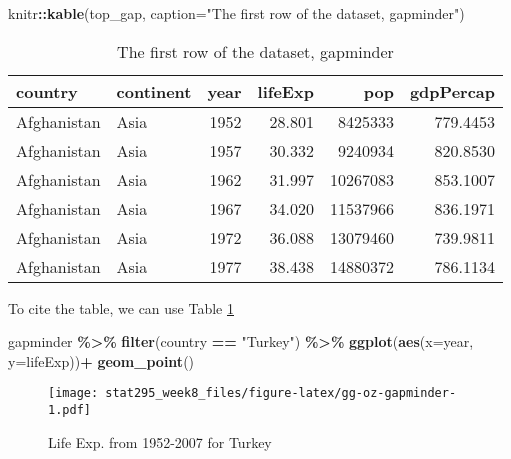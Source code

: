 \documentclass[
]{article}
\newenvironment{Shaded}{\begin{snugshade}}{\end{snugshade}}
\newcommand{\AttributeTok}[1]{\textcolor[rgb]{0.13,0.29,0.53}{#1}}
\newcommand{\FunctionTok}[1]{\textcolor[rgb]{0.13,0.29,0.53}{\textbf{#1}}}
\newcommand{\NormalTok}[1]{#1}
\newcommand{\SpecialCharTok}[1]{\textcolor[rgb]{0.81,0.36,0.00}{\textbf{#1}}}
\newcommand{\StringTok}[1]{\textcolor[rgb]{0.31,0.60,0.02}{#1}}
\begin{document}
\begin{Shaded}
\begin{Highlighting}[]
\NormalTok{knitr}\SpecialCharTok{::}\FunctionTok{kable}\NormalTok{(top\_gap,}
             \AttributeTok{caption=}\StringTok{"The first row of the dataset, gapminder"}\NormalTok{)}
\end{Highlighting}
\end{Shaded}

\begin{table}

\caption{\label{tab:mytable1}The first row of the dataset, gapminder}
\centering
\begin{tabular}[t]{l|l|r|r|r|r}
\hline
country & continent & year & lifeExp & pop & gdpPercap\\
\hline
Afghanistan & Asia & 1952 & 28.801 & 8425333 & 779.4453\\
\hline
Afghanistan & Asia & 1957 & 30.332 & 9240934 & 820.8530\\
\hline
Afghanistan & Asia & 1962 & 31.997 & 10267083 & 853.1007\\
\hline
Afghanistan & Asia & 1967 & 34.020 & 11537966 & 836.1971\\
\hline
Afghanistan & Asia & 1972 & 36.088 & 13079460 & 739.9811\\
\hline
Afghanistan & Asia & 1977 & 38.438 & 14880372 & 786.1134\\
\hline
\end{tabular}
\end{table}

To cite the table, we can use Table \ref{tab:mytable1}

\begin{Shaded}
\begin{Highlighting}[]
\NormalTok{gapminder }\SpecialCharTok{\%\textgreater{}\%}
  \FunctionTok{filter}\NormalTok{(country }\SpecialCharTok{==} \StringTok{"Turkey"}\NormalTok{) }\SpecialCharTok{\%\textgreater{}\%}
  \FunctionTok{ggplot}\NormalTok{(}\FunctionTok{aes}\NormalTok{(}\AttributeTok{x=}\NormalTok{year, }\AttributeTok{y=}\NormalTok{lifeExp))}\SpecialCharTok{+}
  \FunctionTok{geom\_point}\NormalTok{()}
\end{Highlighting}
\end{Shaded}

\begin{figure}
\centering
\texttt{[image: stat295\_week8\_files/figure-latex/gg-oz-gapminder-1.pdf]}
\caption{\label{fig:gg-oz-gapminder}Life Exp. from 1952-2007 for Turkey}
\end{figure}
\end{document}
